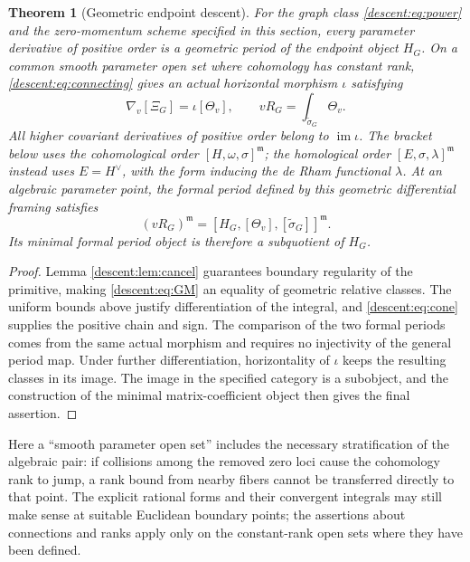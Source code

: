 \documentclass[11pt,a4paper,oneside]{article}
\theoremstyle{plain}
\newtheorem{theorem}{Theorem}[section]
\theoremstyle{definition}
\theoremstyle{remark}
\newcommand{\im}{\operatorname{im}}
\numberwithin{equation}{section}
\begin{document}
\begin{theorem}[Geometric endpoint descent]\label{descent:thm:descent}
For the graph class \eqref{descent:eq:power} and the zero-momentum scheme specified in this section, every parameter derivative of positive order is a geometric period of the endpoint object $H_G$.
On a common smooth parameter open set where cohomology has constant rank, \eqref{descent:eq:connecting} gives an actual horizontal morphism $\iota$ satisfying
\begin{equation}\label{descent:eq:descent}
 \nabla_v[\Xi_G]=\iota[\Theta_v],\qquad
 vR_G=\int_{\widetilde\sigma_G}\Theta_v.
\end{equation}
All higher covariant derivatives of positive order belong to $\im\iota$.
The bracket below uses the cohomological order $[H,\omega,\sigma]^{\mathfrak m}$; the homological order $[E,\sigma,\lambda]^{\mathfrak m}$ instead uses $E=H^\vee$, with the form inducing the de Rham functional $\lambda$.
At an algebraic parameter point, the formal period defined by this geometric differential framing satisfies
\begin{equation}\label{descent:eq:motivic}
 (vR_G)^{\mathfrak m}
     =[H_G,[\Theta_v],[\widetilde\sigma_G]]^{\mathfrak m}.
\end{equation}
Its minimal formal period object is therefore a subquotient of $H_G$.
\end{theorem}
\begin{proof}
Lemma \ref{descent:lem:cancel} guarantees boundary regularity of the primitive, making \eqref{descent:eq:GM} an equality of geometric relative classes.
The uniform bounds above justify differentiation of the integral, and \eqref{descent:eq:cone} supplies the positive chain and sign.
The comparison of the two formal periods comes from the same actual morphism and requires no injectivity of the general period map.
Under further differentiation, horizontality of $\iota$ keeps the resulting classes in its image.
The image in the specified category is a subobject, and the construction of the minimal matrix-coefficient object then gives the final assertion.
\end{proof}

Here a ``smooth parameter open set'' includes the necessary stratification of the algebraic pair: if collisions among the removed zero loci cause the cohomology rank to jump, a rank bound from nearby fibers cannot be transferred directly to that point.
The explicit rational forms and their convergent integrals may still make sense at suitable Euclidean boundary points; the assertions about connections and ranks apply only on the constant-rank open sets where they have been defined.
\end{document}
